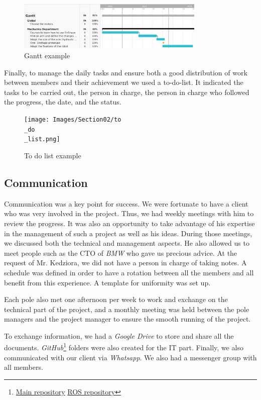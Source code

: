 \begin{figure}[ht]
    \centering
    \includegraphics[width=0.8\textwidth]{Images/Section02/gantt.png}
    \caption{Gantt example}
    \label{fig:GANTTextract}
\end{figure}
\FloatBarrier

\bigbreak
Finally, to manage the daily tasks and ensure both a good distribution of work between members and their achievement we used a to-do-list. It indicated the tasks to be carried out, the person in charge, the person in charge who followed the progress, the date, and the status. 

\begin{figure}[ht]
    \centering
    \texttt{[image: Images/Section02/to\\\_do\\\_list.png]}
    \caption{To do list example}
    \label{fig:ToDoList}
\end{figure}

\subsection{Communication}
\label{Com}
Communication was a key point for success. We were fortunate to have a client who was very involved in the project. Thus, we had weekly meetings with him to review the progress. It was also an opportunity to take advantage of his expertise in the management of such a project as well as his ideas. During those meetings, we discussed both the technical and management aspects. He also allowed us to meet people such as the CTO of \textit{BMW} who gave us precious advice. At the request of Mr. Kedziora, we did not have a person in charge of taking notes. A schedule was defined in order to have a rotation between all the members and all benefit from this experience. A template for uniformity was set up. 

\bigbreak
Each pole also met one afternoon per week to work and exchange on the technical part of the project, and a monthly meeting was held between the pole managers and the project manager to ensure the smooth running of the project. 

\bigbreak
To exchange information, we had a \textit{Google Drive} to store and share all the documents. \textit{GitHub}\footnote{\href{https://github.com/AlessandriniAntoine/Eden_Robotics}{Main repository} \href{https://github.com/AlessandriniAntoine/eden_robotics_ros}{ROS repository}} folders were also created for the IT part. Finally, we also communicated with our client via \textit{Whatsapp}. We also had a messenger group with all members. 

